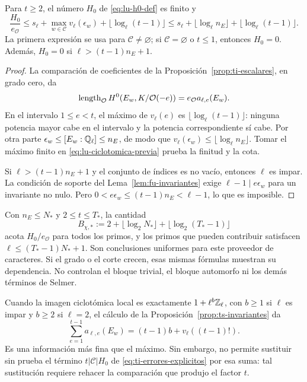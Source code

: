 \begin{proposicion}
\label{prop:lu-h0}
Para $t\ge2$, el número $H_0$ de \eqref{eq:lu-h0-def} es finito y
\begin{equation}
 \frac{H_0}{e_{\mathcal O}}
 \le s_\ell+\max_{w\in\mathcal C}v_\ell(\epsilon_w)
                 +\lfloor\log_\ell(t-1)\rfloor
 \le s_\ell+\lfloor\log_\ell n_E\rfloor
                 +\lfloor\log_\ell(t-1)\rfloor.
 \label{eq:lu-h0-cota}
\end{equation}
La primera expresión se usa para $\mathcal C\ne\varnothing$;
si $\mathcal C=\varnothing$ o $t\le1$, entonces $H_0=0$.
Además, $H_0=0$ si $\ell>(t-1)n_E+1$.
\end{proposicion}
\begin{proof}
La comparación de coeficientes de la
Proposición~\ref{prop:ti-escalares}, en grado cero, da
\[
 \operatorname{length}_{\mathcal O}H^0(E_w,K/\mathcal O(-e))
       =e_{\mathcal O}a_{\ell,e}(E_w).
\]
En el intervalo $1\le e<t$, el máximo de $v_\ell(e)$ es
$\lfloor\log_\ell(t-1)\rfloor$: ninguna potencia mayor cabe en
el intervalo y la potencia correspondiente sí cabe. Por otra
parte $\epsilon_w\le[E_w:\mathbb{Q}_\ell]\le n_E$, de modo que
$v_\ell(\epsilon_w)\le\lfloor\log_\ell n_E\rfloor$.
Tomar el máximo finito en \eqref{eq:lu-ciclotomica-previa} prueba
la finitud y la cota.

Si $\ell>(t-1)n_E+1$ y el conjunto de índices es no vacío,
entonces $\ell$ es impar. La condición de soporte del
Lema~\ref{lem:fu-invariantes} exige
$\ell-1\mid e\epsilon_w$ para un invariante no nulo.
Pero $0<e\epsilon_w\le(t-1)n_E<\ell-1$, lo que es imposible.
\end{proof}

Con $n_E\le N_*$ y $2\le t\le T_*$, la cantidad
\[
 B_{\chi,*}:=2+\lfloor\log_2N_*\rfloor
                    +\lfloor\log_2(T_*-1)\rfloor
\]
acota $H_0/e_{\mathcal O}$ para todos los primos, y los primos
que pueden contribuir satisfacen
$\ell\le(T_*-1)N_*+1$. Son conclusiones uniformes para este
proveedor de caracteres. Si el grado o el corte crecen, esas
mismas fórmulas muestran su dependencia. No controlan el bloque
trivial, el bloque automorfo ni los demás términos de Selmer.

Cuando la imagen ciclotómica local es exactamente
$1+\ell^b\mathbb{Z}_\ell$, con $b\ge1$ si $\ell$ es impar y $b\ge2$
si $\ell=2$, el cálculo de la
Proposición~\ref{prop:ts-invariantes} da
\begin{equation}
 \sum_{e=1}^{t-1}a_{\ell,e}(E_w)
       =(t-1)b+v_\ell((t-1)!).
 \label{eq:lu-suma-caracteres}
\end{equation}
Es una información más fina que el máximo. Sin embargo, no
permite sustituir sin prueba el término $t|\mathcal C|H_0$ de
\eqref{eq:ti-errores-explicitos} por esa suma: tal sustitución
requiere rehacer la comparación que produjo el factor $t$.

